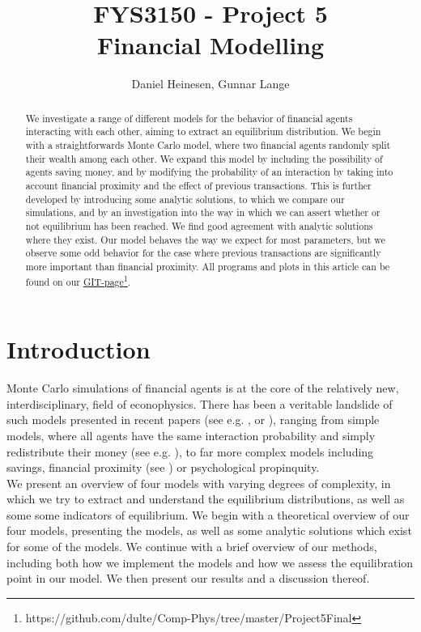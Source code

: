 \documentclass[a4paper, 10pt]{article}
\title{FYS3150 - Project 5\\
Financial Modelling}
\author{Daniel Heinesen, Gunnar Lange}
\begin{document}
\maketitle
\begin{abstract}
We investigate a range of different models for the behavior of financial agents interacting with each other, aiming to extract an equilibrium distribution. We begin with a straightforwards Monte Carlo model, where two financial agents randomly split their wealth among each other. We expand this model by including the possibility of agents saving money, and by modifying the probability of an interaction by taking into account financial proximity and the effect of previous transactions. This is further developed by introducing some analytic solutions, to which we compare our simulations, and by an investigation into the way in which we can assert whether or not equilibrium has been reached. We find good agreement with analytic solutions where they exist. Our model behaves the way we expect for most parameters, but we observe some odd behavior for the case where previous transactions are significantly more important than financial proximity. All programs and plots in this article can be found on our \href{https://github.com/dulte/Comp-Phys/tree/master/Project5Final}{GIT-page}\footnote{https://github.com/dulte/Comp-Phys/tree/master/Project5Final}.
\end{abstract}
\tableofcontents
\section{Introduction}
Monte Carlo simulations of financial agents is at the core of the relatively new, interdisciplinary, field of econophysics. There has been a veritable landslide of such models presented in recent papers (see e.g. \cite{Self-adjusted}, \cite{Finite-size} or \cite{AgentBased}), ranging from simple models, where all agents have the same interaction probability and simply redistribute their money (see e.g. \cite{Gibbs}), to far more complex models including savings, financial proximity (see \cite{AgentBased}) or psychological propinquity.\\
\linebreak
We present an overview of four models with varying degrees of complexity, in which we try to extract and understand the equilibrium distributions, as well as some some indicators of equilibrium. We begin with a theoretical overview of our four models, presenting the models, as well as some analytic solutions which exist for some of the models. We continue with a brief overview of our methods, including both how we implement the models and how we assess the equilibration point in our model. We then present our results and a discussion thereof.
\end{document}
